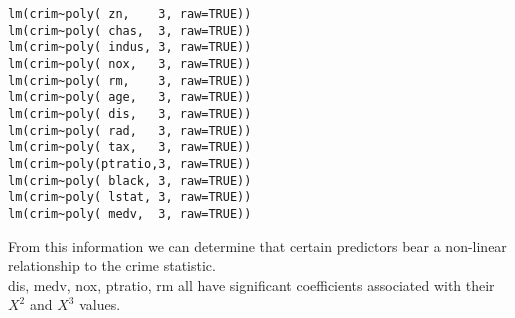 \documentclass[a4paper,man,natbib]{apa6}
\begin{document}
\begin{verbatim}
lm(crim~poly( zn,    3, raw=TRUE))
lm(crim~poly( chas,  3, raw=TRUE))
lm(crim~poly( indus, 3, raw=TRUE))
lm(crim~poly( nox,   3, raw=TRUE))
lm(crim~poly( rm,    3, raw=TRUE))
lm(crim~poly( age,   3, raw=TRUE))
lm(crim~poly( dis,   3, raw=TRUE))
lm(crim~poly( rad,   3, raw=TRUE))
lm(crim~poly( tax,   3, raw=TRUE))
lm(crim~poly(ptratio,3, raw=TRUE))
lm(crim~poly( black, 3, raw=TRUE))
lm(crim~poly( lstat, 3, raw=TRUE))
lm(crim~poly( medv,  3, raw=TRUE))
\end{verbatim}		
From this information we can determine that certain predictors bear a non-linear relationship to the crime statistic. \\
dis, medv, nox, ptratio, rm all have significant coefficients associated with their $X^2$ and $X^3$ values.
	
\end{document}
